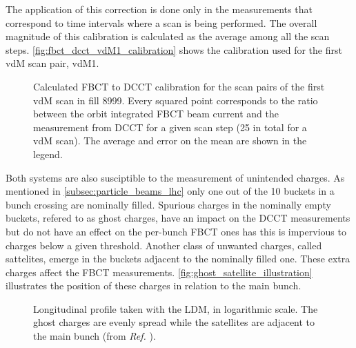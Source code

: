 The application of this correction is done only in the measurements that correspond to time intervals where a scan is being performed. The overall magnitude of this calibration is calculated as the average among all the scan steps. \autoref{fig:fbct_dcct_vdM1_calibration} shows the calibration used for the first vdM scan pair, vdM1.

\begin{figure}[!htb]
	\centering
	\caption{Calculated FBCT to DCCT calibration for the scan pairs of the first vdM scan in fill 8999. Every squared point corresponds to the ratio between the orbit integrated FBCT beam current and the measurement from DCCT for a given scan step (25 in total for a vdM scan). The average and error on the mean are shown in the legend.}
	\label{fig:fbct_dcct_vdM1_calibration}
\end{figure}

Both systems are also susciptible to the measurement of unintended charges. As mentioned in \autoref{subsec:particle_beams_lhc} only one out of the 10 buckets in a bunch crossing are nominally filled. Spurious charges in the nominally empty buckets, refered to as ghost charges, have an impact on the DCCT measurements but do not have an effect on the per-bunch FBCT ones has this is impervious to charges below a given threshold. Another class of unwanted charges, called sattelites, emerge in the buckets adjacent to the nominally filled one. These extra charges affect the FBCT measurements. \autoref{fig:ghost_satellite_illustration} illustrates the position of these charges in relation to the main bunch. 

\begin{figure}[!htb]
	\centering
	\caption{Longitudinal profile taken with the LDM, in logarithmic scale. The ghost charges are evenly spread while the satellites are adjacent to the main bunch (from \textit{Ref.} \cite{Alici:1427728}).}
	\label{fig:ghost_satellite_illustration}
\end{figure}

